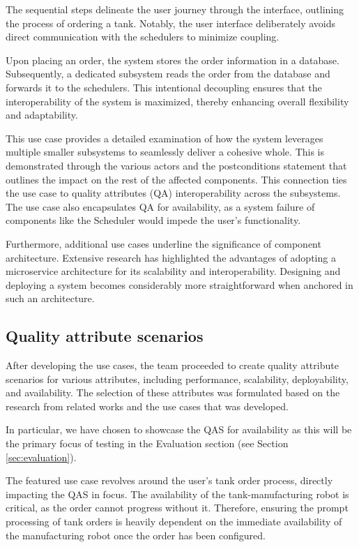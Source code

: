 The sequential steps delineate the user journey through the interface, outlining the process of ordering a tank. Notably, the user interface deliberately avoids direct communication with the schedulers to minimize coupling.

Upon placing an order, the system stores the order information in a database. Subsequently, a dedicated subsystem reads the order from the database and forwards it to the schedulers. This intentional decoupling ensures that the interoperability of the system is maximized, thereby enhancing overall flexibility and adaptability.

This use case provides a detailed examination of how the system leverages multiple smaller subsystems to seamlessly deliver a cohesive whole. 
This is demonstrated through the various actors and the postconditions statement that outlines the impact on the rest of the affected components. This connection ties the use case to quality attributes (QA) interoperability across the subsystems. The use case also encapsulates QA for availability, as a system failure of components like the Scheduler would impede the user's functionality.

Furthermore, additional use cases underline the significance of component architecture. Extensive research has highlighted the advantages of adopting a microservice architecture for its scalability and interoperability. Designing and deploying a system becomes considerably more straightforward when anchored in such an architecture.

\subsection{Quality attribute scenarios}
\label{sec:qas}
After developing the use cases, the team proceeded to create quality attribute scenarios for various attributes, including performance, scalability, deployability, and availability. The selection of these attributes was formulated based on the research from related works and the use cases that was developed.

In particular, we have chosen to showcase the QAS for availability as this will be the primary focus of testing in the Evaluation section (see Section \ref{sec:evaluation}).

The featured use case revolves around the user's tank order process, directly impacting the QAS in focus. The availability of the tank-manufacturing robot is critical, as the order cannot progress without it. Therefore, ensuring the prompt processing of tank orders is heavily dependent on the immediate availability of the manufacturing robot once the order has been configured. 


